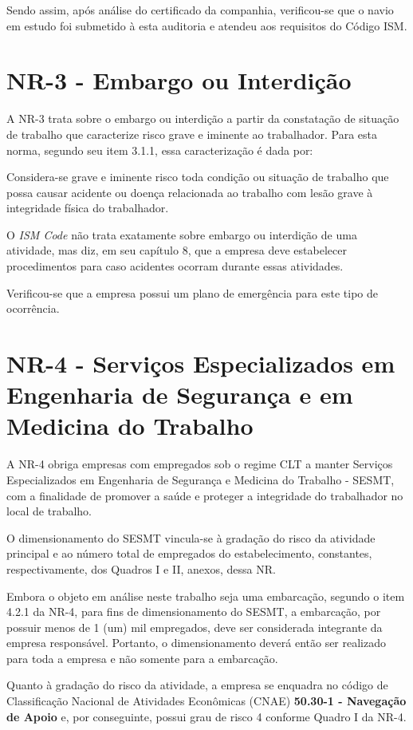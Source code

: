 \documentclass[../main.tex]{subfiles}
\begin{document}
 Sendo assim, após análise do certificado da companhia, verificou-se que o navio em estudo foi submetido à esta auditoria e atendeu aos requisitos do Código ISM.

 \section{NR-3 - Embargo ou Interdição}
 A NR-3 trata sobre o embargo ou interdição a partir da constatação de situação de trabalho que caracterize risco grave e iminente ao trabalhador. Para esta norma, segundo seu item 3.1.1, essa caracterização é dada por:

 \begin{citacao}
 Considera-se grave e iminente risco toda condição ou situação de trabalho que possa causar acidente ou doença relacionada ao trabalho com lesão grave à integridade física do trabalhador.
 \end{citacao}

 O \emph{ISM Code} não trata exatamente sobre embargo ou interdição de uma atividade, mas diz, em seu capítulo 8, que a empresa deve estabelecer procedimentos para caso acidentes ocorram durante essas atividades.

 Verificou-se que a empresa possui um plano de emergência para este tipo de ocorrência.

 \section{NR-4 - Serviços Especializados em Engenharia de Segurança e em Medicina do Trabalho}
 A NR-4 obriga empresas com empregados sob o regime CLT a manter Serviços Especializados em Engenharia de Segurança e Medicina do Trabalho - SESMT, com a finalidade de promover a saúde e proteger a integridade do trabalhador no local de trabalho.
 
 O dimensionamento do SESMT vincula-se à gradação do risco da atividade principal e ao número total de empregados do estabelecimento, constantes, respectivamente, dos Quadros I e II, anexos, dessa NR.
 
 Embora o objeto em análise neste trabalho seja uma embarcação, segundo o item 4.2.1 da NR-4, para fins de dimensionamento do SESMT, a embarcação, por possuir menos de 1 (um) mil empregados, deve ser considerada integrante da empresa responsável. Portanto, o dimensionamento deverá então ser realizado para toda a empresa e não somente para a embarcação.  
 
 Quanto à gradação do risco da atividade, a empresa se enquadra no código de Classificação Nacional de Atividades Econômicas (CNAE) \textbf{50.30-1 - Navegação de Apoio} e, por conseguinte, possui grau de risco 4 conforme Quadro I da NR-4.
 
\end{document}
